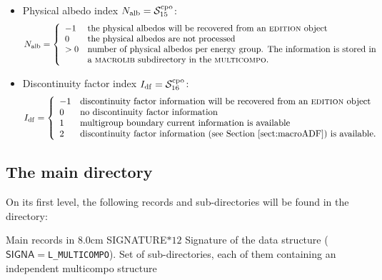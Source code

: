 \begin{itemize}
\begin{displaymath}
\begin{array}{ll}
0 & \textrm{the group form factors are not processed}\\
>0 & \textrm{number of group form factors per energy group. The information is stored in}\\
 & \textrm{a {\sc macrolib} subdirectory in the {\sc multicompo}.}\\
\end{array} \right.
\end{displaymath}
\item Physical albedo index $N_{\rm alb}=\mathcal{S}^{\rm cpo}_{15}$:
\begin{displaymath}
N_{\rm alb} = \left\{
\begin{array}{ll}
-1 & \textrm{the physical albedos will be recovered from an {\sc edition} object}\\
0 & \textrm{the physical albedos are not processed}\\
>0 & \textrm{number of physical albedos per energy group. The information is stored in}\\
 & \textrm{a {\sc macrolib} subdirectory in the {\sc multicompo}.}\\
\end{array} \right.
\end{displaymath}
\item Discontinuity factor index $I_{\rm df}=\mathcal{S}^{\rm cpo}_{16}$:
\begin{displaymath}
I_{\rm df} = \left\{
\begin{array}{ll}
-1 & \textrm{discontinuity factor information will be recovered from an {\sc edition} object}\\
0 & \textrm{no discontinuity factor information}\\
1 & \textrm{multigroup boundary current information is available}\\
2 & \textrm{discontinuity factor information (see \Sect{macroADF}) is available.}
\end{array} \right.
\end{displaymath}
\end{itemize}

\subsection{The main  directory}\label{sect:cpodirmain}

On its first level, the
following records and sub-directories will be found in the  directory:

\begin{DescriptionEnregistrement}{Main records in }{8.0cm}
\CharEnr
  {SIGNATURE}{$*12$}
  {Signature of the data structure ($\mathsf{SIGNA}=${\tt L\_MULTICOMPO}).}
\DirVar
  {}
  {Set of sub-directories, each of them containing an independent {\sc multicompo}
  structure}
\end{DescriptionEnregistrement}

